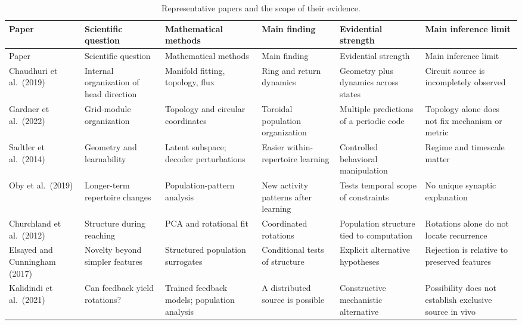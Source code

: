 {\scriptsize\setlength{\tabcolsep}{2pt}
\begin{longtable}{>{\raggedright\arraybackslash}p{.14\linewidth}>{\raggedright\arraybackslash}p{.16\linewidth}>{\raggedright\arraybackslash}p{.16\linewidth}>{\raggedright\arraybackslash}p{.18\linewidth}>{\raggedright\arraybackslash}p{.15\linewidth}>{\raggedright\arraybackslash}p{.13\linewidth}}
\caption{Representative papers and the scope of their evidence.}\label{tab:13-papers}\\
\toprule
Paper & Scientific question & Mathematical methods & Main finding & Evidential strength & Main inference limit\\
\midrule\endfirsthead
\toprule
Paper & Scientific question & Mathematical methods & Main finding & Evidential strength & Main inference limit\\
\midrule\endhead
\bottomrule\endfoot
Chaudhuri et al.\ (2019) & Internal organization of head direction & Manifold fitting, topology, flux & Ring and return dynamics & Geometry plus dynamics across states & Circuit source is incompletely observed\\
Gardner et al.\ (2022) & Grid-module organization & Topology and circular coordinates & Toroidal population organization & Multiple predictions of a periodic code & Topology alone does not fix mechanism or metric\\
Sadtler et al.\ (2014) & Geometry and learnability & Latent subspace; decoder perturbations & Easier within-repertoire learning & Controlled behavioral manipulation & Regime and timescale matter\\
Oby et al.\ (2019) & Longer-term repertoire changes & Population-pattern analysis & New activity patterns after learning & Tests temporal scope of constraints & No unique synaptic explanation\\
Churchland et al.\ (2012) & Structure during reaching & PCA and rotational fit & Coordinated rotations & Population structure tied to computation & Rotations alone do not locate recurrence\\
Elsayed and Cunningham (2017) & Novelty beyond simpler features & Structured population surrogates & Conditional tests of structure & Explicit alternative hypotheses & Rejection is relative to preserved features\\
Kalidindi et al.\ (2021) & Can feedback yield rotations? & Trained feedback models; population analysis & A distributed source is possible & Constructive mechanistic alternative & Possibility does not establish exclusive source in vivo\\

\end{longtable}}
